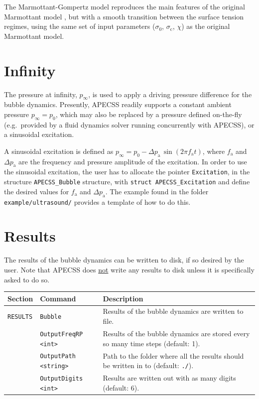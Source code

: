 The Marmottant-Gompertz model reproduces the main features of the original Marmottant model \citep{Guemmer2021}, but with a smooth transition between the surface tension regimes, using the same set of input parameters ($\sigma_0$, $\sigma_\text{c}$, $\chi$) as the original Marmottant model.

\section{Infinity}
\label{sec:infinity}

The pressure at infinity, $p_\infty$, is used to apply a driving pressure difference for the bubble dynamics. Presently, APECSS readily supports a constant ambient pressure $p_\infty = p_0$, which may also be replaced by a pressure defined on-the-fly (e.g.~provided by a fluid dynamics solver running concurrently with APECSS), or a sinusoidal excitation. 

A sinusoidal excitation is defined as $p_\infty = p_0 - \Delta p_\mathrm{a} \, \sin(2 \pi f_\mathrm{a} t)$, where $f_\mathrm{a}$ and $\Delta p_\mathrm{a}$ are the frequency and pressure amplitude of the excitation. In order to use the sinusoidal excitation, the user has to allocate the pointer {\tt *Excitation}, in the structure {\tt APECSS\_Bubble} structure, with {\tt struct APECSS\_Excitation} and define the desired values for  $f_\mathrm{a}$ and $\Delta p_\mathrm{a}$. The example found in the folder {\tt example/ultrasound/} provides a template of how to do this.

\section{Results}
\label{sec:bubble_results}

The results of the bubble dynamics can be written to disk, if so desired by the user. Note that APECSS does \uline{not} write any results to disk unless it is specifically asked to do so.

\vspace{0.8em}

\noindent
\begin{tabular}{p{} p{} p{}}
    \textbf{Section} &\textbf{Command} & \textbf{Description} 
\vspace{1mm} \\ \hline
{\tt RESULTS} & {\tt Bubble} & Results of the bubble dynamics are written to file.\\ 
& {\tt OutputFreqRP <int>} & Results of the bubble dynamics are stored every so many time steps (default: 1).\\ 
& {\tt OutputPath <string>} & Path to the folder where all the results should be written in to (default: {\tt ./}).\\
& {\tt OutputDigits <int>} & Results are written out with as many digits (default: 6).\\
 \hline
\end{tabular} \vspace{1em}

